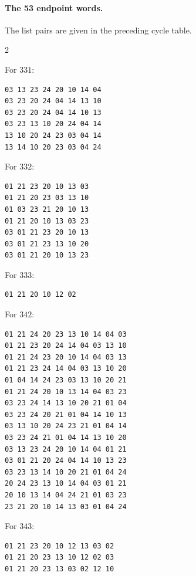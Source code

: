 \documentclass[11pt]{article}
\numberwithin{equation}{section}
\numberwithin{table}{section}
\begin{document}
\paragraph{The 53 endpoint words.}
The list pairs are given in the preceding cycle table.
\begin{multicols}{2}
\small
\noindent\begin{minipage}{\linewidth}
\noindent For $331$:
\begin{verbatim}
03 13 23 24 20 10 14 04
03 23 20 24 04 14 13 10
03 23 20 24 04 14 10 13
03 23 13 10 20 24 04 14
13 10 20 24 23 03 04 14
13 14 10 20 23 03 04 24
\end{verbatim}
\end{minipage}\par\medskip
\noindent\begin{minipage}{\linewidth}
\noindent For $332$:
\begin{verbatim}
01 21 23 20 10 13 03
01 21 20 23 03 13 10
01 03 23 21 20 10 13
01 21 20 10 13 03 23
03 01 21 23 20 10 13
03 01 21 23 13 10 20
03 01 21 20 10 13 23
\end{verbatim}
\end{minipage}\par\medskip
\noindent\begin{minipage}{\linewidth}
\noindent For $333$:
\begin{verbatim}
01 21 20 10 12 02
\end{verbatim}
\end{minipage}\par\medskip
\noindent\begin{minipage}{\linewidth}
\noindent For $342$:
\begin{verbatim}
01 21 24 20 23 13 10 14 04 03
01 21 23 20 24 14 04 03 13 10
01 21 24 23 20 10 14 04 03 13
01 21 23 24 14 04 03 13 10 20
01 04 14 24 23 03 13 10 20 21
01 21 24 20 10 13 14 04 03 23
03 23 24 14 13 10 20 21 01 04
03 23 24 20 21 01 04 14 10 13
03 13 10 20 24 23 21 01 04 14
03 23 24 21 01 04 14 13 10 20
03 13 23 24 20 10 14 04 01 21
03 01 21 20 24 04 14 10 13 23
03 23 13 14 10 20 21 01 04 24
20 24 23 13 10 14 04 03 01 21
20 10 13 14 04 24 21 01 03 23
23 21 20 10 14 13 03 01 04 24
\end{verbatim}
\end{minipage}\par\medskip
\noindent\begin{minipage}{\linewidth}
\noindent For $343$:
\begin{verbatim}
01 21 23 20 10 12 13 03 02
01 21 20 23 13 10 12 02 03
01 21 20 23 13 03 02 12 10

\end{verbatim}
\end{minipage}
\end{multicols}
\end{document}
